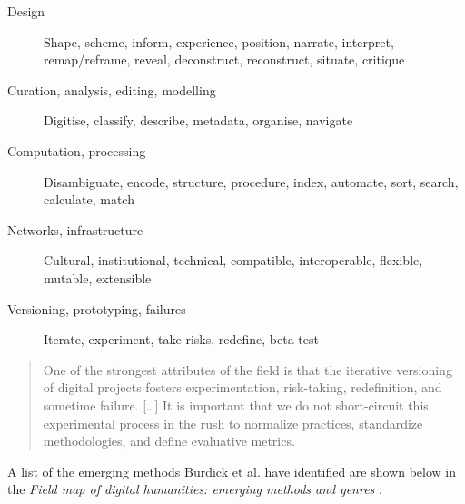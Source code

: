 \begin{description}
  \item [Design] Shape, scheme, inform, experience, position, narrate,
  					interpret, remap/reframe, reveal, deconstruct, reconstruct,
  					situate, critique
  \item [Curation, analysis, editing, modelling] Digitise, classify, describe, metadata, organise, navigate
  \item [Computation, processing] Disambiguate, encode, structure, procedure, index, automate, sort, search, calculate, match
  \item [Networks, infrastructure] Cultural, institutional, technical, compatible, interoperable, flexible, mutable, extensible
  \item [Versioning, prototyping, failures]	Iterate, experiment, take-risks, redefine, beta-test
\end{description}


\begin{quotation}
  One of the strongest attributes of the field is that the iterative versioning of digital projects fosters experimentation, risk-taking, redefinition, and sometime failure. [\ldots] It is important that we do not short-circuit this experimental process in the rush to normalize practices, standardize methodologies, and define evaluative metrics.
\end{quotation}

A list of the emerging methods Burdick et al. have identified are shown below in the \textit{Field map of digital humanities: emerging methods and genres} \citeyear[p.29-60]{Burdick2012}.


